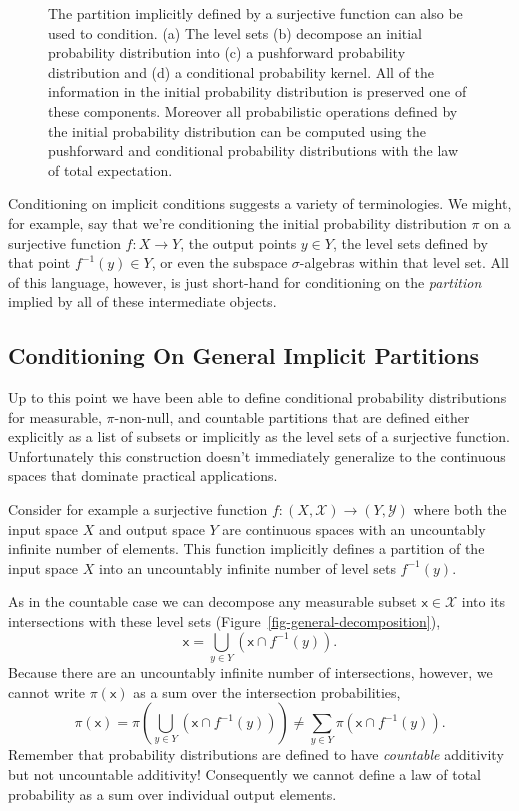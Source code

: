 \documentclass[
  letterpaper,
  DIV=11,
  numbers=noendperiod]{scrartcl}
\begin{document}
\begin{figure}
\begin{minipage}{0.83\linewidth}
\end{minipage}%

\caption{\label{fig-implicit-decomposition}The partition implicitly
defined by a surjective function can also be used to condition. (a) The
level sets (b) decompose an initial probability distribution into (c) a
pushforward probability distribution and (d) a conditional probability
kernel. All of the information in the initial probability distribution
is preserved one of these components. Moreover all probabilistic
operations defined by the initial probability distribution can be
computed using the pushforward and conditional probability distributions
with the law of total expectation.}

\end{figure}%

Conditioning on implicit conditions suggests a variety of terminologies.
We might, for example, say that we're conditioning the initial
probability distribution \(\pi\) on a surjective function
\(f : X \rightarrow Y\), the output points \(y \in Y\), the level sets
defined by that point \(f^{-1}(y) \in Y\), or even the subspace
\(\sigma\)-algebras within that level set. All of this language,
however, is just short-hand for conditioning on the \emph{partition}
implied by all of these intermediate objects.

\subsection{Conditioning On General Implicit
Partitions}\label{sec:general-conditional}

Up to this point we have been able to define conditional probability
distributions for measurable, \(\pi\)-non-null, and countable partitions
that are defined either explicitly as a list of subsets or implicitly as
the level sets of a surjective function. Unfortunately this construction
doesn't immediately generalize to the continuous spaces that dominate
practical applications.

Consider for example a surjective function
\(f: (X, \mathcal{X}) \rightarrow (Y, \mathcal{Y})\) where both the
input space \(X\) and output space \(Y\) are continuous spaces with an
uncountably infinite number of elements. This function implicitly
defines a partition of the input space \(X\) into an uncountably
infinite number of level sets \(f^{-1}(y)\).

As in the countable case we can decompose any measurable subset
\(\mathsf{x} \in \mathcal{X}\) into its intersections with these level
sets (Figure~\ref{fig-general-decomposition}), \[
\mathsf{x} = \bigcup_{y \in Y} \left( \mathsf{x} \cap f^{-1}(y) \right).
\] Because there are an uncountably infinite number of intersections,
however, we cannot write \(\pi(\mathsf{x})\) as a sum over the
intersection probabilities, \[
\pi( \mathsf{x} )
=
\pi \left( \bigcup_{y \in Y}
           \left( \mathsf{x} \cap f^{-1}(y) \right) \right)
\ne
\sum_{y \in Y} \pi( \mathsf{x} \cap f^{-1}(y) ).
\] Remember that probability distributions are defined to have
\emph{countable} additivity but not uncountable additivity! Consequently
we cannot define a law of total probability as a sum over individual
output elements.
\end{document}
